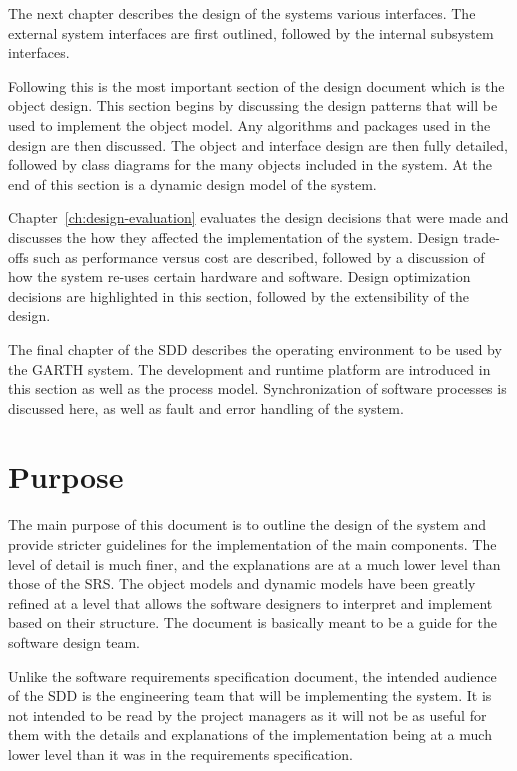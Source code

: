 \documentclass{report}
\begin{document}
The next chapter describes the design of the systems various interfaces. The
external system interfaces are first outlined, followed by the internal
subsystem interfaces.

Following this is the most important section of the design document which is
the object design. This section begins by discussing the design patterns that
will be used to implement the object model. Any algorithms and packages used in
the design are then discussed. The object and interface design are then fully
detailed, followed by class diagrams for the many objects included in the
system.  At the end of this section is a dynamic design model of the system.

Chapter~\ref{ch:design-evaluation} evaluates the design decisions that were
made and discusses the how they affected the implementation of the system.
Design trade-offs such as performance versus cost are described, followed by a
discussion of how the system re-uses certain hardware and software. Design
optimization decisions are highlighted in this section, followed by the
extensibility of the design.

The final chapter of the SDD describes the operating environment to be used
by the GARTH system. The development and runtime platform are introduced in
this section as well as the process model. Synchronization of software
processes is discussed here, as well as fault and error handling of the system.

\section{Purpose}

The main purpose of this document is to outline the design of the system and
provide stricter guidelines for the implementation of the main components. The
level of detail is much finer, and the explanations are at a much lower level
than those of the SRS. The object models and dynamic models have been greatly
refined at a level that allows the software designers to interpret and
implement based on their structure. The document is basically meant to be a
guide for the software design team.

Unlike the software requirements specification document, the intended audience
of the SDD is the engineering team that will be implementing the system. It is
not intended to be read by the project managers as it will not be as useful for
them with the details and explanations of the implementation being at a much
lower level than it was in the requirements specification.
\end{document}
